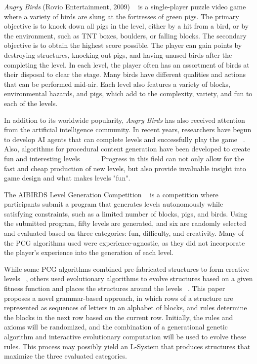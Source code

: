 \documentclass[letterpaper, 10 pt, conference]{ieeeconf}
\begin{document}
\textit{Angry Birds} (Rovio Entertainment, 2009) ~\cite{angrybirds} is a single-player puzzle video game where a variety of birds are slung at the fortresses of green pigs. The primary objective is to knock down all pigs in the level, either by a hit from a bird, or by the environment, such as TNT boxes, boulders, or falling blocks. The secondary objective is to obtain the highest score possible. The player can gain points by destroying structures, knocking out pigs, and having unused birds after the completing the level. In each level, the player often has an assortment of birds at their disposal to clear the stage. Many birds have different qualities and actions that can be performed mid-air. Each level also features a variety of blocks, environmental hazards, and pigs, which add to the complexity, variety, and fun to each of the levels.
\par
In addition to its worldwide popularity, \textit{Angry Birds} has also received attention from the artificial intelligence community. In recent years, researchers have begun to develop AI agents that can complete levels and successfully play the game ~\cite{aibirds2018results}. Also, algorithms for procedural content generation have been developed to create fun and interesting levels ~\cite{renz2017generating} ~\cite{jiang2017mcts} ~\cite{graves2016procedural}. Progress in this field can not only allow for the fast and cheap production of new levels, but also provide invaluable insight into game design and what makes levels "fun".
\par
The AIBIRDS Level Generation Competition ~\cite{birdslgc} is a competition where participants submit a program that generates levels autonomously while satisfying constraints, such as a limited number of blocks, pigs, and birds. Using the submitted program, fifty levels are generated, and six are randomly selected and evaluated based on three categories: fun, difficulty, and creativity. Many of the PCG algorithms used were experience-agnostic, as they did not incorporate the player's experience into the generation of each level.
\par
While some PCG algorithms combined pre-fabricated structures to form creative levels ~\cite{graves2016procedural}, others used evolutionary algorithms to evolve structures based on a given fitness function and places the structures around the levels ~\cite{renz2016procedural}. This paper proposes a novel grammar-based approach, in which rows of a structure are represented as sequences of letters in an alphabet of blocks, and rules determine the blocks in the next row based on the current row. Initially, the rules and axioms will be randomized, and the combination of a generational genetic algorithm and interactive evolutionary computation will be used to evolve these rules. This process may possibly yield an L-System that produces structures that maximize the three evaluated categories. 
\end{document}
